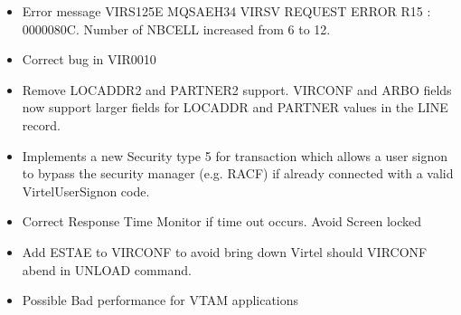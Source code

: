\documentclass[letterpaper,10pt,english]{sphinxmanual}
\begin{document}
\sphinxAtStartPar
{}
\begin{itemize}
\item {} 
\sphinxAtStartPar
Error message VIRS125E MQSAEH34 VIRSV REQUEST ERROR \sphinxhyphen{} R15 : 0000080C. Number of NBCELL increased from 6 to 12.

\end{itemize}

\sphinxAtStartPar
{}
\begin{itemize}
\item {} 
\sphinxAtStartPar
Correct bug in VIR0010

\end{itemize}

\sphinxAtStartPar
{}
\begin{itemize}
\item {} 
\sphinxAtStartPar
Remove LOCADDR2 and PARTNER2 support. VIRCONF and ARBO fields now support larger fields for LOCADDR and PARTNER values in the LINE record.

\end{itemize}

\sphinxAtStartPar
{}
\begin{itemize}
\item {} 
\sphinxAtStartPar
Implements a new Security type 5 for transaction which allows a user signon to bypass the security manager (e.g. RACF) if already connected with a valid VirtelUserSignon code.

\end{itemize}

\sphinxAtStartPar
{}
\begin{itemize}
\item {} 
\sphinxAtStartPar
Correct Response Time Monitor if time out occurs. Avoid Screen locked

\end{itemize}

\sphinxAtStartPar
{}
\begin{itemize}
\item {} 
\sphinxAtStartPar
Add ESTAE to VIRCONF to avoid bring down Virtel should VIRCONF abend in UNLOAD command.

\end{itemize}

\sphinxAtStartPar
{}
\begin{itemize}
\item {} 
\sphinxAtStartPar
Possible Bad performance for VTAM applications

\end{itemize}
\end{document}
